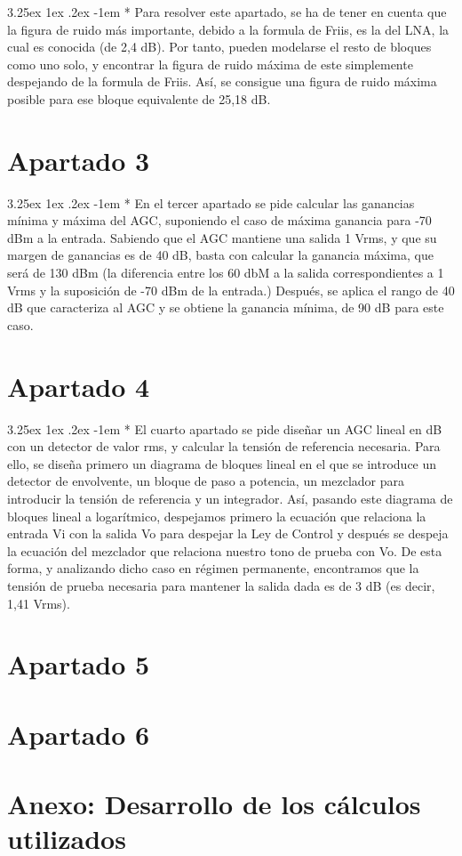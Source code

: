 \documentclass[12pt]{article}
\makeatletter
\renewcommand\paragraph{\@startsection{paragraph}{5}{\z@}%
  {3.25ex \@plus1ex \@minus.2ex}%
  {-1em}%
  {\normalfont\normalsize\bfseries}}
\makeatother
\begin{document}
  \paragraph*{}
  Para resolver este apartado, se ha de tener en cuenta que la figura de ruido más importante, debido a la formula de Friis, es la del LNA, la cual es conocida (de 2,4 dB).
  Por tanto, pueden modelarse el resto de bloques como uno solo, y encontrar la figura de ruido máxima de este simplemente despejando de la formula de Friis. Así,
  se consigue una figura de ruido máxima posible para ese bloque equivalente de 25,18 dB.

  \section{Apartado 3}
  \paragraph*{}
  En el tercer apartado se pide calcular las ganancias mínima y máxima del AGC, suponiendo el caso de máxima ganancia para -70 dBm a la entrada.
  Sabiendo que el AGC mantiene una salida 1 Vrms, y que su margen de ganancias es de 40 dB, basta con calcular la ganancia máxima, que será de 130 dBm
  (la diferencia entre los 60 dbM a la salida correspondientes a 1 Vrms y la suposición de -70 dBm de la entrada.) Después, se aplica el rango de 40 dB que
  caracteriza al AGC y se obtiene la ganancia mínima, de 90 dB para este caso.
  \section{Apartado 4}
  \paragraph*{}
  El cuarto apartado se pide diseñar un AGC lineal en dB con un detector de valor rms, y calcular la tensión de referencia necesaria.
  Para ello, se diseña primero un diagrama de bloques lineal en el que se introduce un detector de envolvente, un bloque de paso a potencia,
  un mezclador para introducir la tensión de referencia y un integrador. Así, pasando este diagrama de bloques lineal a logarítmico, despejamos primero
  la ecuación que relaciona la entrada Vi con la salida Vo para despejar la Ley de Control y después se despeja la ecuación del mezclador que relaciona nuestro
  tono de prueba con Vo. De esta forma, y analizando dicho caso en régimen permanente, encontramos que la tensión de prueba necesaria para mantener la salida dada es de 3 dB (es decir, 
  1,41 Vrms).
  \section{Apartado 5}
    
  \section{Apartado 6}

  \section{Anexo: Desarrollo de los cálculos utilizados}

  
  
 
\end{document}

